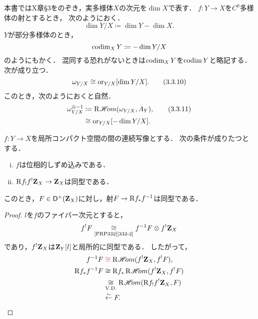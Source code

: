 \begin{leftbar}
\begin{NTN}[{\cite[Notation 3.3.8]{KS90}}]
    本書ではX章\S3をのぞき，実多様体\(X\)の次元を\(\dim X\)で表す．
    \(f\colon Y\to X\)を\(C^0\)多様体の射とするとき，
    次のようにおく．
    \begin{equation}
        \dim{Y/X}\coloneqq \dim Y-\dim{X}.\tag{3.3.9}
    \end{equation}
    \(Y\)が部分多様体のとき，
    \[
        \mathop{\mathrm{codim}}\nolimits_{X}Y\coloneqq-\dim{Y/X}
    \]
    のようにもかく．
    混同する恐れがないときは\(\mathop{\mathrm{codim}}\nolimits_X Y\)を\(\mathop{\mathrm{codim}}\nolimits Y\)と略記する．
    次が成り立つ．
    \begin{equation}
        \omega_{Y/X}\cong
        \mathord{\mathrm{or}}_{Y/X}[\dim{Y/X}].\tag{3.3.10}
    \end{equation}
    このとき，次のようにおくと自然．
    \begin{align}
            \omega_{Y/X}^{\otimes{-1}}&\coloneqq
            \mathop{\mathrm{R}\hspace{-1.5pt}\mathop{\mathscr{H}\hspace{-2pt}om}\nolimits}\nolimits(\omega_{Y/X},A_Y),\tag{3.3.11}\\
            &\cong\mathord{\mathrm{or}}_{Y/X}[-\dim{Y/X}].\notag
    \end{align}
\end{NTN}
\end{leftbar}
\begin{leftbar}
\begin{PRP}[{\cite[Proposition 3.3.9]{KS90}}]\label{339}
    \(f\colon Y\to X\)を局所コンパクト空間の間の連続写像とする．
    次の条件が成りたつとする．
    \begin{enumerate}[(i)]
        \item \(f\)は位相的しずめ込みである．
        \item \(\mathrm{R} f_!f^!\mathbf{Z}_X\to\mathbf{Z}_X\)は同型である．\label{339-2}
    \end{enumerate}
    このとき，\(F\in\mathop{\mathsf{D}^\mathrm{+}}\nolimits(\mathbf{Z}_X)\)に対し，射\(F\to \mathrm{R} f_\ast f^{-1}\)は同型である．
\end{PRP}
\end{leftbar}

\begin{proof}
    \(l\)を\(f\)のファイバー次元とすると，
    \[
        f^!F\underset{\text{\ref{PRP332}\eqref{332-2}}}{\cong}
        f^{-1}F\otimes f^!\mathbf{Z}_X
    \]
    であり，\(f^{!}\mathbf{Z}_X\)は\(\mathbf{Z}_Y[l]\)と局所的に同型である．
    したがって，
    \begin{align*}
        f^{-1}F&\mathrel{\textcolor{red}{\cong}}\mathop{\mathrm{R}\hspace{-1.5pt}\mathop{\mathscr{H}\hspace{-2pt}om}\nolimits}\nolimits(f^!\mathbf{Z}_X,f^!F),\\
        \mathrm{R} f_\ast f^{-1}F
        &\cong \mathrm{R} f_\ast\mathop{\mathrm{R}\hspace{-1.5pt}\mathop{\mathscr{H}\hspace{-2pt}om}\nolimits}\nolimits(f^!\mathbf{Z}_X,f^!F)\\
        &\mathrel{\underset{\text{V.D.}}{\cong}} \mathop{\mathrm{R}\hspace{-1.5pt}\mathop{\mathscr{H}\hspace{-2pt}om}\nolimits}\nolimits(\mathrm{R} f_! f^!\mathbf{Z}_X,F)\\
        &\mathrel{\overset{\sim}{\leftarrow}} F.
    \end{align*}
\end{proof}


